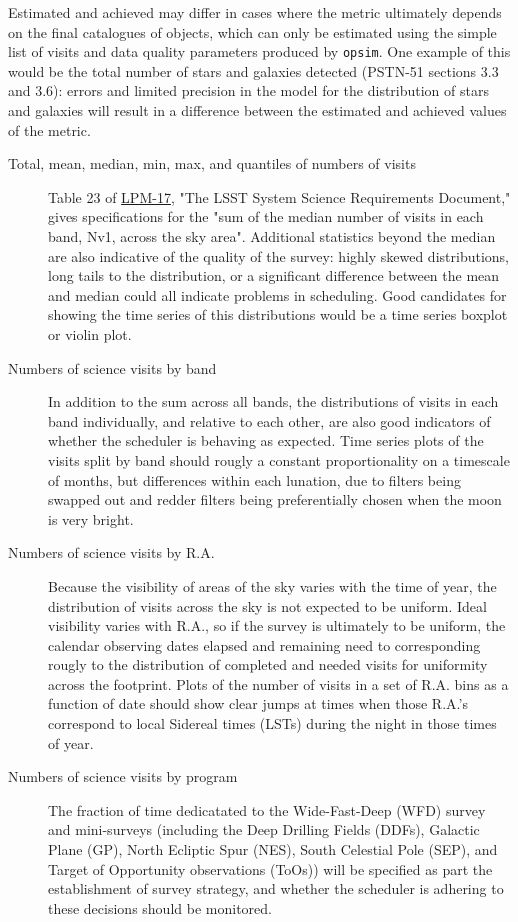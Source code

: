 Estimated and achieved may differ in cases where the metric ultimately depends on the final catalogues of objects, which can only be estimated using the simple list of visits and data quality parameters produced by \texttt{opsim}.
One example of this would be the total number of stars and galaxies detected (PSTN-51 sections 3.3 and 3.6): errors and limited precision in the model for the distribution of stars and galaxies will result in a difference between the estimated and achieved values of the metric.

\begin{description}
\item[{Total, mean, median, min, max, and quantiles of numbers of visits}] Table 23 of \href{http://ls.st/lpm-17}{LPM-17}, "The LSST System Science Requirements Document," gives specifications for the "sum of the median number of visits in each band, Nv1, across the sky area". Additional statistics beyond the median are also indicative of the quality of the survey: highly skewed distributions, long tails to the distribution, or a significant difference between the mean and median could all indicate problems in scheduling. Good candidates for showing the time series of this distributions would be a time series boxplot or violin plot.
\item[{Numbers of science visits by band}] In addition to the sum across all bands, the distributions of visits in each band individually, and relative to each other, are also good indicators of whether the scheduler is behaving as expected. Time series plots of the visits split by band should rougly a constant proportionality on a timescale of months, but differences within each lunation, due to filters being swapped out and redder filters being preferentially chosen when the moon is very bright.
\item[{Numbers of science visits by R.A.}] Because the visibility of areas of the sky varies with the time of year, the distribution of visits across the sky is not expected to be uniform. Ideal visibility varies with R.A., so if the survey is ultimately to be uniform, the calendar observing dates elapsed and remaining need to corresponding rougly to the distribution of completed and needed visits for uniformity across the footprint. Plots of the number of visits in a set of R.A. bins as a function of date should show clear jumps at times when those R.A.'s correspond to local Sidereal times (LSTs) during the night in those times of year.
\item[{Numbers of science visits by program}] The fraction of time dedicatated to the Wide-Fast-Deep (WFD) survey and mini-surveys (including the Deep Drilling Fields (DDFs), Galactic Plane (GP), North Ecliptic Spur (NES), South Celestial Pole (SEP), and Target of Opportunity observations (ToOs)) will be specified as part the establishment of survey strategy, and whether the scheduler is adhering to these decisions should be monitored.

\end{description}
